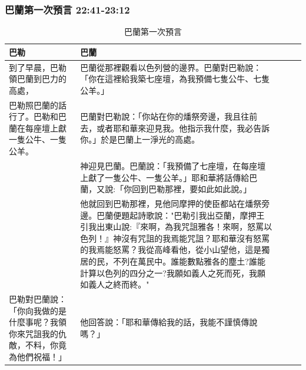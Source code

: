 \subsubsection{巴蘭第一次預言 22:41-23:12}
\begin{table}[H]
\begin{tabular}{@{}p{}*{4}{L{\tabcolsep\relax}}@{}}
\toprule
巴勒&巴蘭 \\\hline
到了早晨，巴勒領巴蘭到巴力的高處，&巴蘭從那裡觀看以色列營的邊界。巴蘭對巴勒說：「你在這裡給我築七座壇，為我預備七隻公牛、七隻公羊。」\\\hline
巴勒照巴蘭的話行了。巴勒和巴蘭在每座壇上獻一隻公牛、一隻公羊。&巴蘭對巴勒說：「你站在你的燔祭旁邊，我且往前去，或者耶和華來迎見我。他指示我什麼，我必告訴你。」於是巴蘭上一淨光的高處。\\\hline
&神迎見巴蘭。巴蘭說：「我預備了七座壇，在每座壇上獻了一隻公牛、一隻公羊。」耶和華將話傳給巴蘭，又說:「你回到巴勒那裡，要如此如此說。」 \\\hline
&他就回到巴勒那裡，見他同摩押的使臣都站在燔祭旁邊。巴蘭便題起詩歌說："巴勒引我出亞蘭，摩押王引我出東山說:『來啊，為我咒詛雅各！來啊，怒罵以色列！』神沒有咒詛的我焉能咒詛？耶和華沒有怒罵的我焉能怒罵？我從高峰看他，從小山望他，這是獨居的民，不列在萬民中。誰能數點雅各的塵土?誰能計算以色列的四分之一?我願如義人之死而死，我願如義人之終而終。"\\\hline
巴勒對巴蘭說：「你向我做的是什麼事呢？我領你來咒詛我的仇敵，不料，你竟為他們祝福！」&他回答說：「耶和華傳給我的話，我能不謹慎傳說嗎？」\\\hline
\bottomrule
\end{tabular}
\caption{巴蘭第一次預言}
\end{table} 



